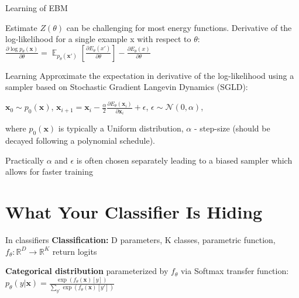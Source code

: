 \documentclass{beamer}
\begin{document}
\begin{frame}{Learning of EBM}
    \begin{block}{}
        Estimate $Z(\theta)$ can be challenging for most energy functions.
        Derivative of the log-likelihood for a single example x with respect to $\theta$: $\frac{\partial \log p_{\theta}(\mathbf{x})}{\partial \theta} = \mathop{\mathbb{E}}_{p_{\theta}(\mathbf{x'})} \left[\frac{\partial E_{\theta}(x')}{\partial \theta}\right] - \frac{\partial E_{\theta}(x)}{\partial \theta}$
    \end{block}
    
    \begin{block}{Learning} 
         Approximate the expectation in derivative of the log-likelihood using a sampler based on Stochastic Gradient Langevin Dynamics (SGLD):
        
        $\mathbf{x}_0 \sim p_0(\mathbf{x})$, $\mathbf{x}_{i+1} = \mathbf{x}_{i} - \frac{\alpha}{2} \frac{\partial E_{\theta}(\mathbf{x}_i)}{\partial \mathbf{x}_i} + \epsilon$, $\epsilon \sim \mathcal{N}(0,\alpha)$, 
        
        where $p_0(\mathbf{x})$ is typically a Uniform distribution,  $\alpha$ - step-size (should be decayed following a polynomial schedule). 
        
        Practically $\alpha$ and $\epsilon$ is often chosen separately leading to a biased sampler which allows for faster training
    \end{block}
\end{frame}

\section{What Your Classifier Is Hiding}
\begin{frame}{In classifiers}
    \textbf{Classification:} D parameters, K classes, parametric function, $f_{\theta} : \mathbb{R}^{D} \rightarrow \mathbb{R}^{K}$ return logits
   
    \textbf{Categorical distribution} parameterized by   $f_{\theta}$ via Softmax transfer function: $p_{\theta}(y|\mathbf{x}) = \frac{\exp{(f_{\theta}(\mathbf{x})[y])}}{\sum_{y'}{\exp{(f_{\theta}(\mathbf{x})[y'])}}}$

\end{frame}
\end{document}
